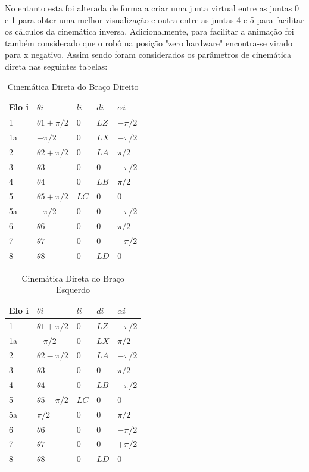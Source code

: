 \documentclass{report}
\begin{document}
 No entanto esta foi alterada de forma a criar uma junta virtual entre as juntas 0 e 1 para obter uma melhor visualização e outra entre as juntas 4 e 5 para facilitar os cálculos da cinemática inversa. Adicionalmente, para facilitar a animação foi também considerado que o robô na posição "zero hardware" encontra-se virado para x negativo. Assim sendo foram considerados os parâmetros de cinemática direta nas seguintes tabelas:

\begin{table}[H]
\centering
\caption{Cinemática Direta do Braço Direito}
\label{table:cinematica_direta_direito}
\begin{tabular}{ | m{1.7cm} | m{1.7cm}| m{1.7cm} | m{1.7cm} | m{1.7cm} | }
\hline
Elo i & $\theta i$ & $li$ & $di$ & $\alpha i$ \\
\hline
1 & $\theta 1 + \pi /2$ & $0$ & $LZ$ & $-\pi /2$ \\
\hline
1a & $- \pi /2$ & $0$ & $LX$ & $-\pi /2$ \\
\hline
2 & $\theta 2 + \pi /2$ & $0$ & $LA$ & $\pi /2$ \\
\hline
3 & $\theta 3$ & $0$ & $0$ & $-\pi /2$ \\
\hline
4 & $\theta 4$ & $0$ & $LB$ & $\pi /2$ \\
\hline
5 & $\theta 5 + \pi /2$ & $LC$ & $0$ & $0$ \\
\hline
5a & $- \pi /2$ & $0$ & $0$ & $-\pi /2$ \\
\hline
6 & $\theta 6$ & $0$ & $0$ & $\pi /2$ \\
\hline
7 & $\theta 7$ & $0$ & $0$ & $-\pi /2$ \\
\hline
8 & $\theta 8$ & $0$ & $LD$ & $0$ \\
\hline
\end{tabular}
\end{table}

\begin{table}[H]
\centering
\caption{Cinemática Direta do Braço Esquerdo}
\label{table:cinematica_direta_esquerdo}
\begin{tabular}{ | m{1.7cm} | m{1.7cm}| m{1.7cm} | m{1.7cm} | m{1.7cm} | }
\hline
Elo i & $\theta i$ & $li$ & $di$ & $\alpha i$ \\
\hline
1 & $\theta 1 + \pi /2$ & $0$ & $LZ$ & $-\pi /2$ \\
\hline
1a & $- \pi /2$ & $0$ & $LX$ & $\pi /2$ \\
\hline
2 & $\theta 2 - \pi /2$ & $0$ & $LA$ & $-\pi /2$ \\
\hline
3 & $\theta 3$ & $0$ & $0$ & $\pi /2$ \\
\hline
4 & $\theta 4$ & $0$ & $LB$ & $-\pi /2$ \\
\hline
5 & $\theta 5 - \pi /2$ & $LC$ & $0$ & $0$ \\
\hline
5a & $\pi /2$ & $0$ & $0$ & $\pi /2$ \\
\hline
6 & $\theta 6$ & $0$ & $0$ & $-\pi /2$ \\
\hline
7 & $\theta 7$ & $0$ & $0$ & $+\pi /2$ \\
\hline
8 & $\theta 8$ & $0$ & $LD$ & $0$ \\
\hline
\end{tabular}
\end{table}
\end{document}
